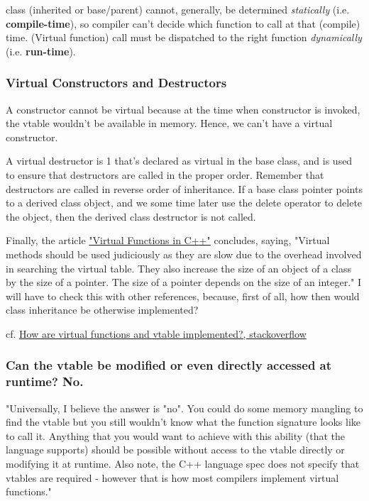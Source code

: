 \documentclass[10pt]{amsart}
\begin{document}
\begin{multicols*}{2}
class (inherited or base/parent) cannot, generally, be determined \emph{statically} (i.e. \textbf{compile-time}), so compiler can't decide which function to call at that (compile) time.  (Virtual function) call must be dispatched to the right function \emph{dynamically} (i.e. \textbf{run-time}).  
  

\subsubsection{Virtual Constructors and Destructors}  

A constructor cannot be virtual because at the time when constructor is invoked, the vtable wouldn't be available in memory.  Hence, we can't have a virtual constructor.  

A virtual destructor is 1 that's declared as virtual in the base class, and is used to ensure that destructors are called in the proper order.  Remember that destructors are called in reverse order of inheritance.  If a base class pointer points to a derived class object, and we some time later use the delete operator to delete the object, then the derived class destructor is not called.  

Finally, the article \href{http://wayback.archive.org/web/20100209040010/http://www.codersource.net/published/view/325/virtual_functions_in.aspx}{"Virtual Functions in C++"} concludes, saying, "Virtual methods should be used judiciously as they are slow due to the overhead involved in searching the virtual table. They also increase the size of an object of a class by the size of a pointer. The size of a pointer depends on the size of an integer."  I will have to check this with other references, because, first of all, how then would class inheritance be otherwise implemented?  

cf. \href{https://stackoverflow.com/questions/99297/how-are-virtual-functions-and-vtable-implemented}{How are virtual functions and vtable implemented?, stackoverflow}  

\subsubsection{Can the vtable be modified or even directly accessed at runtime?  No.}  

"Universally, I believe the answer is "no". You could do some memory mangling to find the vtable but you still wouldn't know what the function signature looks like to call it. Anything that you would want to achieve with this ability (that the language supports) should be possible without access to the vtable directly or modifying it at runtime. Also note, the C++ language spec does not specify that vtables are required - however that is how most compilers implement virtual functions."  



\end{multicols*}
\end{document}
